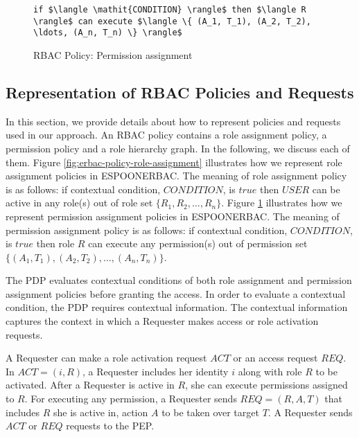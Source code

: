 \documentclass[epsfig,a4paper,11pt,titlepage]{book}
\numberwithin{algorithm}{chapter}
\newcommand{\Keywords}{\lstset{keywords={if,then,can,be,active,in,execute}}}
\begin{document}
\begin{figure} [htp]
\Keywords
\begin{lstlisting}[style=AMMA,numbers=none,breaklines,mathescape,rulesepcolor=\color{black}]
if $\langle \mathit{CONDITION} \rangle$ then $\langle R \rangle$ can execute $\langle \{ (A_1, T_1), (A_2, T_2), \ldots, (A_n, T_n) \} \rangle$

\end{lstlisting}
\caption[RBAC Policy: Permission assignment]{\gls{RBAC} Policy: Permission assignment}
\label{fig:erbac-policy-permission-assignment}
\end{figure}

\subsection[Representation of RBAC Policies and Requests]{Representation of \gls{RBAC} Policies and Requests}
\label{sec:representation}
In this section, we provide details about how to represent policies and requests used in our approach. An \gls{RBAC} policy contains a role assignment policy, a permission policy and a role hierarchy graph. In the following, we discuss each of them. Figure \ref{fig:erbac-policy-role-assignment} illustrates how we represent role assignment policies in \gls{ESPOONERBAC}. The meaning of role assignment policy is as follows: if contextual condition, $\mathit{CONDITION}$, is $\mathit{true}$ then $USER$ can be active in any role(s) out of role set $\{ R_1, R_2, \ldots, R_n \}$. Figure \ref{fig:erbac-policy-permission-assignment} illustrates how we represent permission assignment policies in \gls{ESPOONERBAC}. The meaning of permission assignment policy is as follows: if contextual condition, $\mathit{CONDITION}$, is $\mathit{true}$ then role $R$ can execute any permission(s) out of permission set $\{ (A_1, T_1), (A_2, T_2), \ldots, (A_n, T_n) \}$.

The \gls{PDP} evaluates contextual conditions of both role assignment and permission assignment policies before granting the access. In order to evaluate a contextual condition, the \gls{PDP} requires contextual information. The contextual information captures the context in which a Requester makes access or role activation requests.

A Requester can make a role activation request $\mathit{ACT}$ or an access request $\mathit{REQ}$. In $\mathit{ACT} = (i, R)$, a Requester includes her identity $i$ along with role $R$ to be activated. After a Requester is active in $R$, she can execute permissions assigned to $R$. For executing any permission, a Requester sends $\mathit{REQ} = (R, A, T)$ that includes $R$ she is active in, action $A$ to be taken over target $T$. A Requester sends $\mathit{ACT}$ or $\mathit{REQ}$ requests to the \gls{PEP}. 
\end{document}
